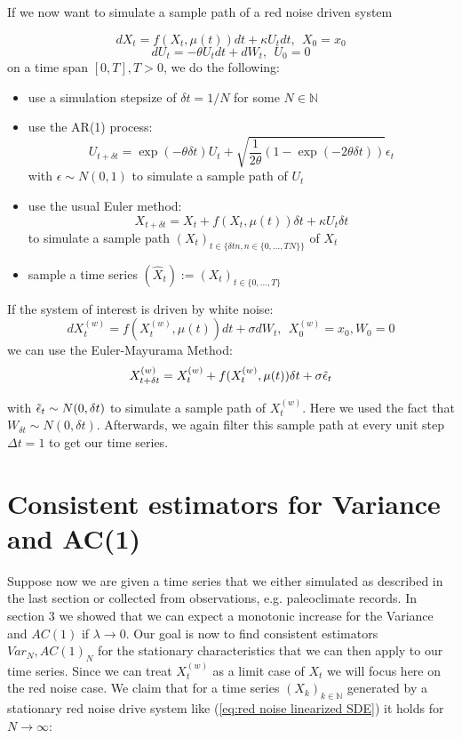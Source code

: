 \documentclass[%
thesis=student,%
coverpage=false,%
titlepage=false,%
headmarks=true, %
english,%
font=libertine, %
math=newpxtx, %
BCOR=5mm,%
coverBCOR=11mm%
]{tumbook}
\begin{document}
If we now want to simulate a sample path of a red noise driven system

\[ 
     dX_{t} = f(X_{t},\mu(t))dt + \kappa U_{t}dt,\ \  X_{0} = x_{0}
\]
\[
     dU_{t} = -\theta U_{t}dt + dW_{t},\ \ U_{0} = 0
\]
on a time span $[0,T], T > 0$, we do the following: 
\begin{itemize}
    \item use a simulation stepsize of $\delta t = 1/N$ for some $N \in \mathbb{N}$
    \item use the AR(1) process:
    \[
    U_{t+\delta t} = \exp(-\theta \delta t)U_{t} + \sqrt{\frac{1}{2\theta}(1-\exp(-2\theta \delta t))}\epsilon_{t}
    \]
    with $\epsilon \sim N(0,1)$ to simulate a sample path of $U_{t}$
    \item use the usual Euler method:
    \[
        X_{t+\delta t} = X_{t} + f(X_{t},\mu(t))\delta t + \kappa U_{t}\delta t
    \]
    to simulate a sample path $(X_{t})_{t\in\{\delta t n, n \in \{0,...,TN\}\}}$ of $X_{t}$
    \item sample a time series $(\widehat{X}_t) := (X_t)_{t\in\{0,...,T\}}$
\end{itemize}


If the system of interest is driven by white noise: 
\[
    dX_{t}^{(w)} = f(X_{t}^{(w)},\mu(t))dt + \sigma dW_{t}, \ \ X_{0}^{(w)} = x_{0}, W_{0} = 0
\]
we can use the Euler-Mayurama Method:
\[
X_{t+\delta t}^{(w)} = X_{t}^{(w)} + f(X_{t}^{(w)},\mu(t))\delta t + \sigma\Tilde{\epsilon}_t
\]

with $\Tilde{\epsilon}_t \sim N(0,\delta t)$ to simulate a sample path of $X_{t}^{(w)}$. Here we used the fact that $W_{\delta t} \sim N(0,\delta t)$. Afterwards, we again filter this sample path at every unit step $\Delta t = 1$ to get our time series.



\chapter{Consistent estimators for Variance and AC(1)}

Suppose now we are given a time series that we either simulated as described in the last section or collected from observations, e.g. paleoclimate records. In section 3 we showed that we can expect a monotonic increase for the Variance and $AC(1)$ if $\lambda \rightarrow 0$. Our goal is now to find consistent estimators $Var_N, AC(1)_N$ for the stationary characteristics that we can then apply to our time series. Since we can treat $X_{t}^{(w)}$ as a limit case of $X_{t}$ we will focus here on the red noise case. We claim that for a time series $(X_{k})_{k\in\mathbb{N}}$ generated by a stationary red noise drive system like (\ref{eq:red noise linearized SDE}) it holds for $N \rightarrow \infty$:
\end{document}
